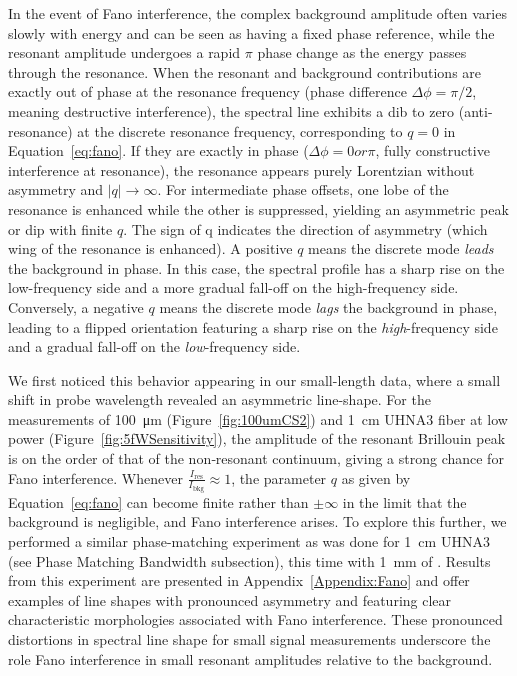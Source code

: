 In the event of Fano interference, the complex background amplitude often varies slowly with energy and can be seen as having a fixed phase reference, while the resonant amplitude undergoes a rapid \(\pi\) phase change as the energy passes through the resonance. \cite{limonov2017fano} When the resonant and background contributions are exactly out of phase at the resonance frequency (phase difference \(\Delta\phi = \pi/2\), meaning destructive interference), the spectral line exhibits a dib to zero (anti-resonance) at the discrete resonance frequency, corresponding to \(q=0\) in Equation~\ref{eq:fano}. If they are exactly in phase (\(\Delta\phi = 0 or \pi\), fully constructive interference at resonance), the resonance appears purely Lorentzian without asymmetry and \(|q| \to \infty\). For intermediate phase offsets, one lobe of the resonance is enhanced while the other is suppressed, yielding an asymmetric peak or dip with finite \(q\). The sign of q indicates the direction of asymmetry (which wing of the resonance is enhanced). A positive \(q\) means the discrete mode \textit{leads} the background in phase. In this case, the spectral profile has a sharp rise on the low-frequency side and a more gradual fall-off on the high-frequency side. Conversely, a negative \(q\) means the discrete mode \textit{lags} the background in phase, leading to a flipped orientation featuring a sharp rise on the \textit{high}-frequency side and a gradual fall-off on the \textit{low}-frequency side.

We first noticed this behavior appearing in our small-length  data, where a small shift in probe wavelength revealed an asymmetric line-shape. For the measurements of \SI{100}{\micro\meter}  (Figure~\ref{fig:100umCS2}) and \SI{1}{\centi\meter} \ac{UHNA3} fiber at low power (Figure~\ref{fig:5fWSensitivity}), the amplitude of the resonant Brillouin peak is on the order of that of the non‐resonant continuum, giving a strong chance for Fano interference. Whenever \(\tfrac{I_{\text{res}}}{I_{\text{bkg}}}\approx 1\), the parameter \(q\) as given by Equation~\ref{eq:fano} can become finite rather than \(\pm \infty\) in the limit that the background is negligible, and Fano interference arises. To explore this further, we performed a similar phase-matching experiment as was done for \SI{1}{\centi\meter} \ac{UHNA3} (see Phase Matching Bandwidth subsection), this time with \SI{1}{\milli\meter} of . Results from this experiment are presented in Appendix~\ref{Appendix:Fano} and offer examples of line shapes with pronounced asymmetry and featuring clear characteristic morphologies associated with Fano interference. These pronounced distortions in spectral line shape for small signal measurements underscore the role Fano interference in small resonant amplitudes relative to the background.

